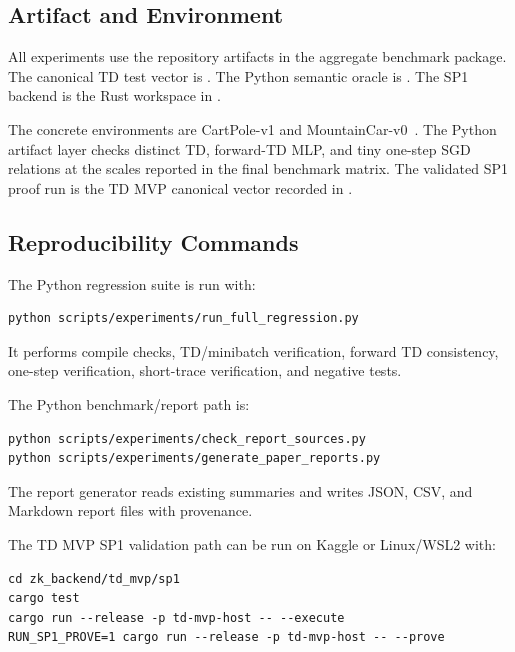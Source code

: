\subsection{Artifact and Environment}

All experiments use the repository artifacts in the aggregate benchmark
package. The
canonical TD test vector is
. The Python semantic
oracle is . The
SP1 backend is the Rust workspace in .

The concrete environments are CartPole-v1 and MountainCar-v0~\cite{brockman2016gym}.
The Python artifact layer checks distinct TD, forward-TD MLP, and tiny
one-step SGD relations at the scales reported in the final benchmark matrix.
The validated SP1 proof run is the TD MVP canonical vector recorded in
.

\subsection{Reproducibility Commands}

The Python regression suite is run with:
{\scriptsize
\begin{verbatim}
python scripts/experiments/run_full_regression.py
\end{verbatim}
}
It performs compile checks, TD/minibatch verification, forward TD consistency,
one-step verification, short-trace verification, and negative tests.

The Python benchmark/report path is:
{\scriptsize
\begin{verbatim}
python scripts/experiments/check_report_sources.py
python scripts/experiments/generate_paper_reports.py
\end{verbatim}
}
The report generator reads existing summaries and writes JSON, CSV, and
Markdown report files with provenance.

The TD MVP SP1 validation path can be run on Kaggle or Linux/WSL2 with:
{\scriptsize
\begin{verbatim}
cd zk_backend/td_mvp/sp1
cargo test
cargo run --release -p td-mvp-host -- --execute
RUN_SP1_PROVE=1 cargo run --release -p td-mvp-host -- --prove
\end{verbatim}
}

